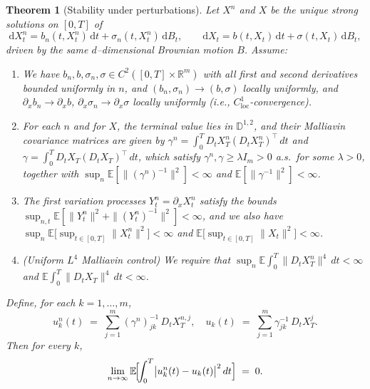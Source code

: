 \documentclass[]{interact}
\newcommand{\1}{\mathbf{1}}
\theoremstyle{plain}%
\newtheorem{theorem}{Theorem}[section]
\theoremstyle{definition}
\theoremstyle{remark}
\numberwithin{equation}{section}
\begin{document}
\begin{theorem}[Stability under perturbations]
Let \(X^n\) and \(X\) be the unique strong solutions on \([0,T]\) of
\[
  \mathrm dX^n_t = b_n(t,X^n_t)\,\mathrm dt + \sigma_n(t,X^n_t)\,\mathrm dB_t,
  \qquad
  \mathrm dX_t   = b(t,X_t)\,\mathrm dt + \sigma(t,X_t)\,\mathrm dB_t,
\]
driven by the same \(d\)--dimensional Brownian motion \(B\).  Assume:
\begin{enumerate}[label=(\roman*)]
  \item We have $b_n, b, \sigma_n, \sigma \in C^2([0,T] \times \mathbb{R}^m)$ with all first and second derivatives 
    bounded uniformly in $n$, and $(b_n, \sigma_n) \to (b, \sigma)$ locally uniformly, and 
    $\partial_x b_n \to \partial_x b$, $\partial_x \sigma_n \to \partial_x \sigma$ locally uniformly 
    (i.e., $C^1_{\mathrm{loc}}$-convergence).
    
  \item For each $n$ and for $X$, the terminal value lies in $\mathbb{D}^{1,2}$, and their Malliavin 
    covariance matrices are given by
    $\gamma^n = \int_0^T D_t X_T^n (D_t X_T^n)^\top \, dt$ and 
    $\gamma = \int_0^T D_t X_T (D_t X_T)^\top \, dt$,
    which satisfy $\gamma^n, \gamma \geq \lambda I_m > 0$ a.s.\ for some $\lambda > 0$, together with
    $\sup_n \mathbb{E}[\|(\gamma^n)^{-1}\|^2] < \infty$ and $\mathbb{E}[\|\gamma^{-1}\|^2] < \infty$.
    
  \item The first variation processes $Y_t^n = \partial_x X_t^n$ satisfy the bounds
    $\sup_{n,t} \mathbb{E}[\|Y_t^n\|^2 + \|(Y_t^n)^{-1}\|^2] < \infty$, and we also have
    $\sup_n \mathbb{E}\big[\sup_{t \in [0,T]} \|X_t^n\|^2\big] < \infty$ and 
    $\mathbb{E}\big[\sup_{t \in [0,T]} \|X_t\|^2\big] < \infty$.
    
  \item \textit{(Uniform $L^4$ Malliavin control)} We require that
    $\sup_n \mathbb{E} \int_0^T \|D_t X_T^n\|^4 \, dt < \infty$ and 
    $\mathbb{E} \int_0^T \|D_t X_T\|^4 \, dt < \infty$.
\end{enumerate}
Define, for each \(k=1,\dots,m\),
\[
  u^n_k(t)
  \;=\;\sum_{j=1}^m(\gamma^n)^{-1}_{jk}\,D_tX_T^{n,j},
  \quad
  u_k(t)
  \;=\;\sum_{j=1}^m\gamma^{-1}_{jk}\,D_tX_T^j.
\]
Then for every \(k\),
\[
  \lim_{n\to\infty}
  \mathbb{E}\!\Bigl[\!\int_0^T\bigl|u^n_k(t)-u_k(t)\bigr|^2\,dt\Bigr]
  \;=\;0.
\]
\end{theorem}
\end{document}
